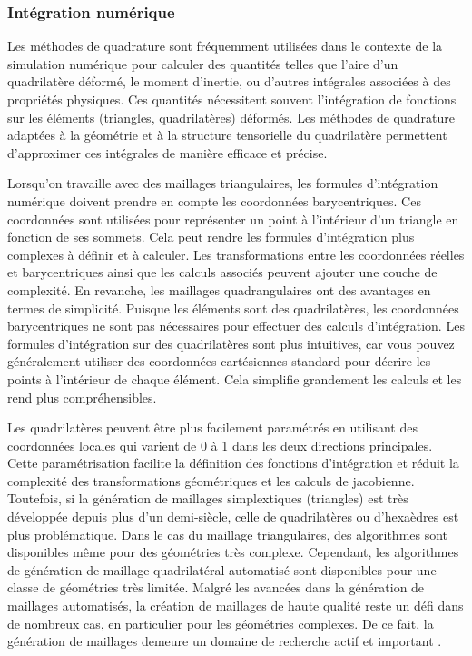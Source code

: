  \subsubsection{Intégration numérique}

 Les méthodes de quadrature sont fréquemment utilisées dans le contexte de la simulation numérique pour calculer des quantités telles que l'aire d'un quadrilatère déformé, le moment d'inertie, ou d'autres intégrales associées à des propriétés physiques. Ces quantités nécessitent souvent l'intégration de fonctions sur les éléments (triangles, quadrilatères) déformés. Les méthodes de quadrature adaptées à la géométrie et à la structure tensorielle du quadrilatère permettent d'approximer ces intégrales de manière efficace et précise.
 
Lorsqu'on travaille avec des maillages triangulaires, les formules d'intégration numérique doivent prendre en compte les coordonnées barycentriques. Ces coordonnées sont utilisées pour représenter un point à l'intérieur d'un triangle en fonction de ses sommets. Cela peut rendre les formules d'intégration plus complexes à définir et à calculer. Les transformations entre les coordonnées réelles et barycentriques ainsi que les calculs associés peuvent ajouter une couche de complexité. En revanche, les maillages quadrangulaires ont des avantages en termes de simplicité. Puisque les éléments sont des quadrilatères, les coordonnées barycentriques ne sont pas nécessaires pour effectuer des calculs d'intégration. Les formules d'intégration sur des quadrilatères sont plus intuitives, car vous pouvez généralement utiliser des coordonnées cartésiennes standard pour décrire les points à l'intérieur de chaque élément. Cela simplifie grandement les calculs et les rend plus compréhensibles.

Les quadrilatères peuvent être plus facilement paramétrés en utilisant des coordonnées locales qui varient de 0 à 1 dans les deux directions principales. Cette paramétrisation facilite la définition des fonctions d'intégration et réduit la complexité des transformations géométriques et les calculs de jacobienne.\\


Toutefois, si la génération de maillages simplextiques (triangles) est très développée depuis plus d'un demi-siècle, celle de quadrilatères ou d'hexaèdres est plus problématique.
Dans le cas du maillage triangulaires, des algorithmes sont disponibles même pour des géométries très complexe. Cependant, les algorithmes de génération de maillage quadrilatéral automatisé sont disponibles pour une classe de géométries très limitée. Malgré les avancées dans la génération de maillages automatisés, la création de maillages de haute qualité reste un défi dans de nombreux cas, en particulier pour les géométries complexes. De ce fait, la génération de maillages demeure un domaine de recherche actif et important \cite{shepherd2008hexahedral}.

